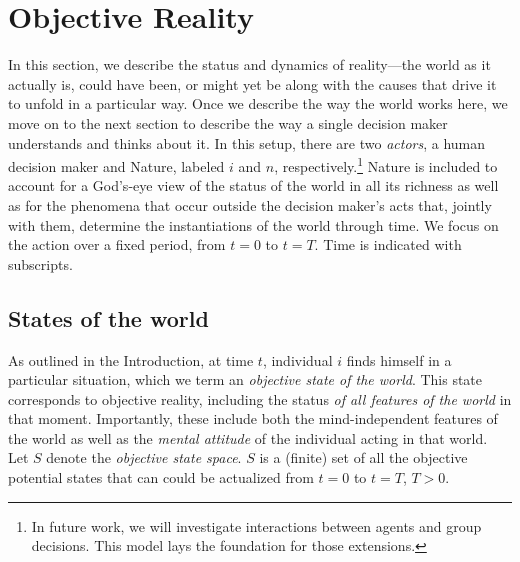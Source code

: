 \documentclass[
11pt,
titlepage,
reqno,
]{article}%
\theoremstyle{definition}
\begin{document}
	
\section{Objective Reality}\label{sec:world}
	
In this section, we describe the status and dynamics of reality---the world as it actually is, could have been, or might yet be along with the causes that drive it to unfold in a particular way. 
Once we describe the way the world works here, we move on to the next section to describe the way a single decision maker understands and thinks about it.
In this setup, there are two \textit{actors}, a human decision maker and Nature, labeled $i$ and $n$, respectively.\footnote
{
	In future work, we will investigate interactions between agents and group decisions.
		This model lays the foundation for those extensions.
} 
Nature is included to account for  a God's-eye view of the status of the world in all its richness as well as for the phenomena that occur outside the decision maker's acts that, jointly with them, determine the instantiations of the world through time.
We focus on the action over a fixed period, from $t=0$ to $t=T$. 
Time is indicated with subscripts.
	
	
	
	
	
\subsection{States of the world\label{sec:states}}
	
As outlined in the Introduction, at time $t$, individual $i$ finds himself in a particular situation, which we term an \textit{objective state of the world}.
This state corresponds to objective reality, including the status \textit{of all features of the world} in that moment. 
Importantly, these include both the  mind-independent features of the world as well as the \textit{mental attitude} of the individual acting in that world. 
Let $S$ denote the \textit{objective state space}.
$S$ is a (finite) set of all the objective potential states  that can could be actualized from $t=0$ to $t=T$, $T>0$.
\end{document}
